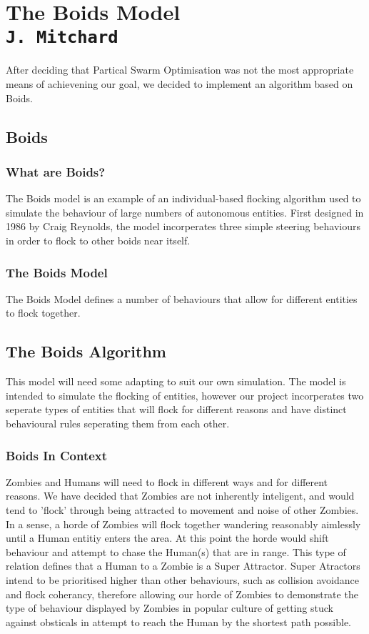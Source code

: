 \section{The Boids Model\\{\small\tt J.~Mitchard}}
After deciding that Partical Swarm Optimisation was not the most appropriate means of achievening our goal, we decided to implement an algorithm based on Boids.

\subsection{Boids}
\subsubsection{What are Boids?}
The Boids model is an example of an individual-based flocking algorithm used to simulate the behaviour of large numbers of autonomous entities. First designed in 1986 by Craig Reynolds, the model incorperates three simple steering behaviours in order to flock to other boids near itself.

\subsubsection{The Boids Model}
The Boids Model defines a number of behaviours that allow for different entities to flock together.

\subsection{The Boids Algorithm}
This model will need some adapting to suit our own simulation. The model is intended to simulate the flocking of entities, however our project incorperates two seperate types of entities that will flock for different reasons and have distinct behavioural rules seperating them from each other.

\subsubsection{Boids In Context}
Zombies and Humans will need to flock in different ways and for different reasons. We have decided that Zombies are not inherently inteligent, and would tend to 'flock' through being attracted to movement and noise of other Zombies. In a sense, a horde of Zombies will flock together wandering reasonably aimlessly until a Human entitiy enters the area. At this point the horde would shift behaviour and attempt to chase the Human(s) that are in range. This type of relation defines that a Human to a Zombie is a Super Attractor. Super Atractors intend to be prioritised higher than other behaviours, such as collision avoidance and flock coherancy, therefore allowing our horde of Zombies to demonstrate the type of behaviour displayed by Zombies in popular culture of getting stuck against obsticals in attempt to reach the Human by the shortest path possible.

